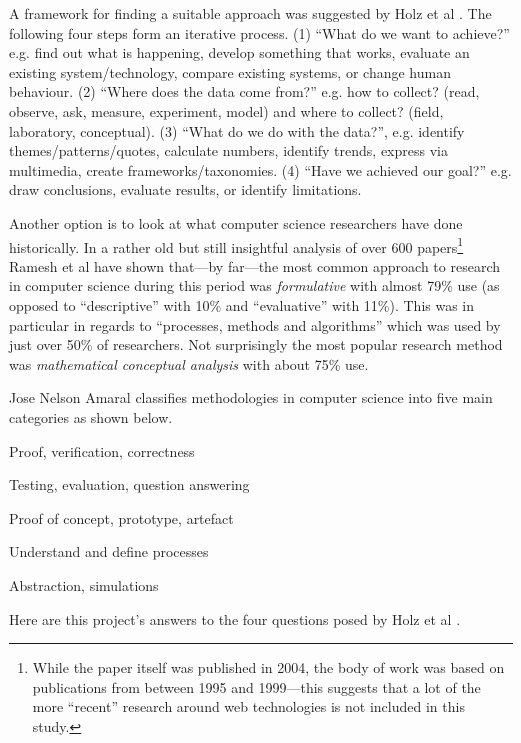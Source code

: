 A framework for finding a suitable approach was suggested by Holz et al \autocite*{Holz2006}. The following four steps form an iterative process. (1) ``What do we want to achieve?'' e.g. find out what is happening, develop something that works, evaluate an existing system/technology, compare existing systems, or change human behaviour. (2) ``Where does the data come from?'' e.g. how to collect? (read, observe, ask, measure, experiment, model) and where to collect? (field, laboratory, conceptual). (3) ``What do we do with the data?'', e.g. identify themes/patterns/quotes, calculate numbers, identify trends, express via multimedia, create frameworks/taxonomies. (4) ``Have we achieved our goal?'' e.g. draw conclusions, evaluate results, or identify limitations.

Another option is to look at what computer science researchers have done historically. In a rather old but still insightful analysis of over 600 papers\footnote{While the paper itself was published in 2004, the body of work was based on publications from between 1995 and 1999---this suggests that a lot of the more ``recent'' research around web technologies is not included in this study.} Ramesh et al \autocite*{Ramesh2004} have shown that---by far---the most common approach to research in computer science during this period was \emph{formulative} with almost 79\% use (as opposed to ``descriptive'' with 10\% and ``evaluative'' with 11\%). This was in particular in regards to ``processes, methods and algorithms'' which was used by just over 50\% of researchers. Not surprisingly the most popular research method was \emph{mathematical conceptual analysis} with about 75\% use.

Jose Nelson Amaral \autocite*{Amaral2006} classifies methodologies in computer science into five main categories as shown below.

\begin{description}[leftmargin=3.5cm]
  \item [Formal] Proof, verification, correctness
  \item [Experimental] Testing, evaluation, question answering
  \item [Build] Proof of concept, prototype, artefact
  \item [Process] Understand and define processes
  \item [Model] Abstraction, simulations
\end{description}

\spirals

Here are this project's answers to the four questions posed by Holz et al \autocite*{Holz2006}.

